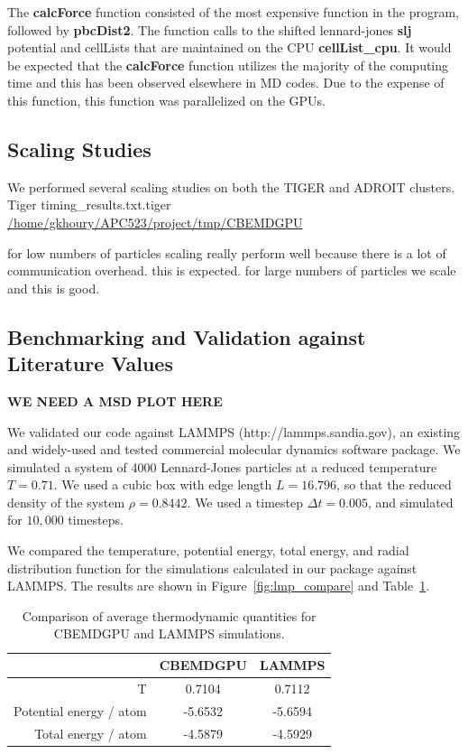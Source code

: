 \documentclass[12pt]{article}
\begin{document}
The \textbf{calcForce} function consisted of the most expensive function in the program, followed by \textbf{pbcDist2}. The function calls to the shifted lennard-jones \textbf{slj} potential and cellLists that are maintained on the CPU \textbf{cellList\_cpu}. It would be expected that the \textbf{calcForce} function utilizes the majority of the computing time and this has been observed elsewhere in MD codes. Due to the expense of this function, this function was parallelized on the GPUs.

\subsection{Scaling Studies}

We performed several scaling studies on both the TIGER and ADROIT clusters.
Tiger timing\_results.txt.tiger
\url{/home/gkhoury/APC523/project/tmp/CBEMDGPU}

for low numbers of particles scaling really  perform well because there is a lot of communication overhead.
this is expected.
for large numbers of particles we scale and this is good.

\subsection{Benchmarking and Validation against Literature Values}

\textbf{WE NEED A MSD PLOT HERE}

We validated our code against LAMMPS \cite{Plimpton1995} (http://lammps.sandia.gov), an existing and widely-used and tested commercial molecular dynamics software package.
%
We simulated a system of 4000 Lennard-Jones particles at a reduced temperature $T=0.71$.
%
We used a cubic box with edge length $L=16.796$, so that the reduced density of the system $\rho = 0.8442$.
%
We used a timestep $\Delta t=0.005$, and simulated for $10,000$ timesteps.


We compared the temperature, potential energy, total energy, and radial distribution function for the simulations calculated in our package against LAMMPS.
%
The results are shown in Figure~\ref{fig:lmp_compare} and Table~\ref{table:lmp_compare}.
%

\begin{table}
\begin{centering}
	\begin{tabular}{| r | c | c |}
		\hline
		 & CBEMDGPU & LAMMPS \\
		 \hline
		 T & 0.7104 & 0.7112 \\
		 \hline
		 Potential energy / atom & -5.6532 & -5.6594 \\
		 \hline
		 Total energy / atom & -4.5879 & -4.5929 \\
		 \hline
	\end{tabular}
	\caption{Comparison of average thermodynamic quantities for CBEMDGPU and LAMMPS simulations.}
	\label{table:lmp_compare}
\end{centering}
\end{table}
\end{document}
